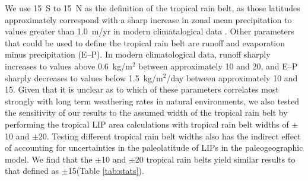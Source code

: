 \documentclass[11pt,letterpaper]{article}
\begin{document}
We use 15\textdegree~S to 15\textdegree~N as the definition of the tropical rain belt, as those latitudes approximately correspond with a sharp increase in zonal mean precipitation to values greater than 1.0~m/yr in modern climatalogical data \citep{Kalnay1996a}. Other parameters that could be used to define the tropical rain belt are runoff and evaporation minus precipitation (E--P). In modern climatological data, runoff sharply increases to values above 0.6~kg/m$^{2}$ between approximately 10 and 20\textdegree\xspace \citep{Kalnay1996a}, and E--P sharply decreases to values below 1.5~kg/m$^{2}$/day between approximately 10 and 15\textdegree \citep{Trenberth2011a}. Given that it is unclear as to which of these parameters correlates most strongly with long term weathering rates in natural environments, we also tested the sensitivity of our results to the assumed width of the tropical rain belt by performing the tropical LIP area calculations with tropical rain belt widths of $\pm$10\textdegree\xspace and $\pm$20\textdegree. Testing different tropical rain belt widths also has the indirect effect of accounting for uncertainties in the paleolatitude of LIPs in the paleogeographic model. We find that the $\pm$10\textdegree\xspace and $\pm$20\textdegree\xspace tropical rain belts yield similar results to that defined as $\pm$15\textdegree\xspace (Table \ref{tab:stats}).
\end{document}
